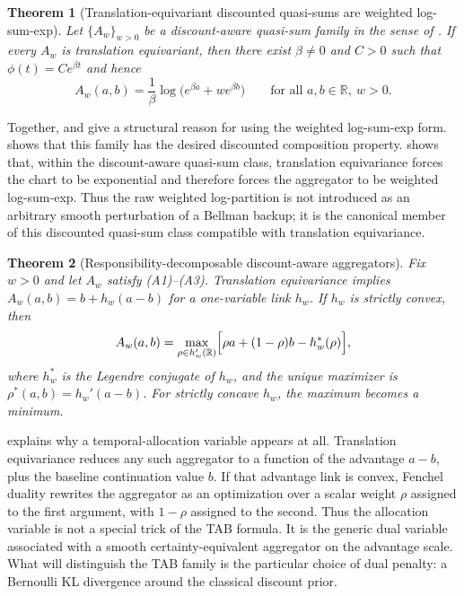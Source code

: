 \documentclass{article}
\newtheorem{theorem}{Theorem}[section]
\theoremstyle{remark}
\newcommand{\R}{\mathbb{R}}
\begin{document}
\begin{theorem}[Translation-equivariant discounted quasi-sums are weighted log-sum-exp]
\label{thm:uniqueness}
Let $\{A_w\}_{w>0}$ be a discount-aware quasi-sum family in the sense of
. If every $A_w$ is translation equivariant, then there exist
$\beta\neq 0$ and $C>0$ such that $\phi(t)=Ce^{\beta t}$ and hence
\begin{equation}
A_w(a,b)=\frac{1}{\beta}\log\!\bigl(e^{\beta a}+w e^{\beta b}\bigr)
\qquad \text{for all } a,b\in\R,\ w>0.
\label{eq:discount-aware-quasi-sum}
\end{equation}
\end{theorem}

Together,  and  give a structural reason for using the
weighted log-sum-exp form.  shows that this family has the desired
discounted composition property.  shows that, within the discount-aware
quasi-sum class, translation equivariance forces the chart to be exponential and therefore forces the
aggregator to be weighted log-sum-exp. Thus the raw weighted log-partition is not introduced as an
arbitrary smooth perturbation of a Bellman backup; it is the canonical member of this discounted
quasi-sum class compatible with translation equivariance.

\begin{theorem}[Responsibility-decomposable discount-aware aggregators]
\label{thm:broad-class}
Fix $w>0$ and let $A_w$ satisfy \textnormal{(A1)--(A3)}. Translation equivariance implies
$A_w(a,b)=b+h_w(a-b)$ for a one-variable link $h_w$. If $h_w$ is strictly convex, then
\begin{equation}
A_w(a,b)
=
\max_{\rho\in h_w'(\R)}
\Bigl[\rho a +(1-\rho)b-h_w^*(\rho)\Bigr],
\label{eq:broad-decomp}
\end{equation}
where $h_w^*$ is the Legendre conjugate of $h_w$, and the unique maximizer is
$\rho^*(a,b)=h_w'(a-b)$. For strictly concave $h_w$, the maximum becomes a minimum.
\end{theorem}

 explains why a temporal-allocation variable appears at all. Translation
equivariance reduces any such aggregator to a function of the advantage $a-b$, plus the baseline
continuation value $b$. If that advantage link is convex, Fenchel duality rewrites the aggregator as
an optimization over a scalar weight $\rho$ assigned to the first argument, with $1-\rho$ assigned to
the second. Thus the allocation variable is not a special trick of the TAB formula. It is the generic
dual variable associated with a smooth certainty-equivalent aggregator on the advantage scale. What
will distinguish the TAB family is the particular choice of dual penalty: a Bernoulli KL divergence
around the classical discount prior.
\end{document}
